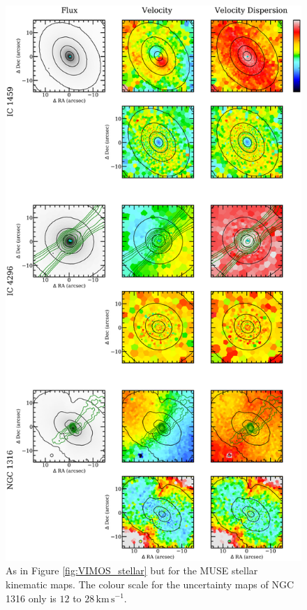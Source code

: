 		\begin{figure}
			\centering
			\includegraphics[height=0.94\textheight]{chapter4/muse/kin1.png}
			\caption[MUSE stellar kinematic maps]{As in Figure \ref{fig:VIMOS_stellar} but for the MUSE stellar kinematic maps. The colour scale for the uncertainty maps of NGC 1316 only is $12$ to $28 \, \mathrm{km \, s^{-1}}$.}
			\label{fig:MUSE_stellar}
		\end{figure}
